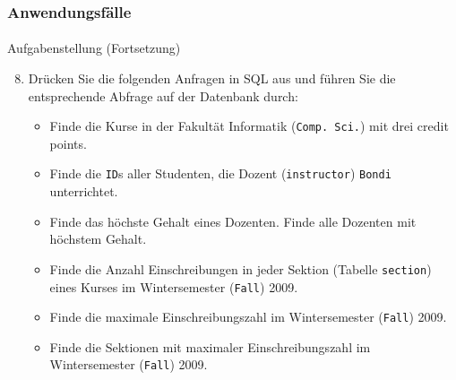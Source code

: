\begin{frame}[t]
\frametitle{Anwendungsf\"alle}
\framesubtitle{\insertsubsection}
\begin{alertblock}{Aufgabenstellung (Fortsetzung)}
\begin{enumerate}
 \setcounter{enumi}{7}	
 \item\label{U3} Dr\"ucken Sie die folgenden Anfragen in SQL aus und f\"uhren Sie die entsprechende Abfrage auf der 
  Datenbank durch:
  \begin{itemize}
   \item Finde die Kurse in der Fakult\"at Informatik (\texttt{Comp.~Sci.}) mit drei credit points.
   \item Finde die \texttt{ID}s aller Studenten, die Dozent (\texttt{instructor}) 
    \texttt{Bondi} unterrichtet. 
   \item Finde das h\"ochste Gehalt eines Dozenten. Finde alle Dozenten mit h\"ochstem Gehalt.
   \item Finde die Anzahl Einschreibungen in jeder Sektion (Tabelle \texttt{section}) eines Kurses im Wintersemester 
    (\texttt{Fall}) 2009.
   \item Finde die maximale Einschreibungszahl im Wintersemester (\texttt{Fall}) 2009.
   \item Finde die Sektionen mit maximaler Einschreibungszahl im Wintersemester (\texttt{Fall}) 2009.
  \end{itemize}
\end{enumerate}
\end{alertblock}
\end{frame}

